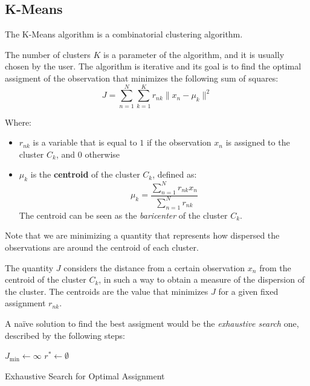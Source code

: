 \subsection{K-Means}
The K-Means algorithm is a combinatorial clustering algorithm.

The number of clusters $K$ is a parameter of the algorithm, and it is usually chosen by the user. The algorithm is iterative and its goal is to find the optimal assigment of the observation that minimizes the following sum of squares:
\[
    J = \sum_{n=1}^{N} \sum_{k=1}^K r_{nk} \|x_n - \mu_k\|^2
\]

Where:
\begin{itemize}
    \item $r_{nk}$ is a variable that is equal to $1$ if the observation $x_n$ is assigned to the cluster $C_k$, and $0$ otherwise
    \item $\mu_k$ is the \textbf{centroid} of the cluster $C_k$, defined as:
    \[
        \mu_k = \frac{\sum_{n=1}^{N} r_{nk} x_n}{\sum_{n=1}^{N} r_{nk}}
    \]
    The centroid can be seen as the \textit{baricenter} of the cluster $C_k$. 
\end{itemize}

Note that we are minimizing a quantity that represents how dispersed the observations are around the centroid of each cluster.

The quantity $J$ considers the distance from a certain observation $x_n$ from the centroid of the cluster $C_k$, in such a way to obtain a measure of the dispersion of the cluster. The centroids are the value that minimizes $J$ for a given fixed assignment $r_{nk}$.

A naïve solution to find the best assigment would be the \textit{exhaustive search} one, described by the following steps:
\begin{algorithm}
    \SetAlgoLined
    
    
    $J_{\text{min}} \leftarrow \infty$\;
    $r^\ast \leftarrow \emptyset$\;
    
    
    \caption{Exhaustive Search for Optimal Assignment}
\end{algorithm}

